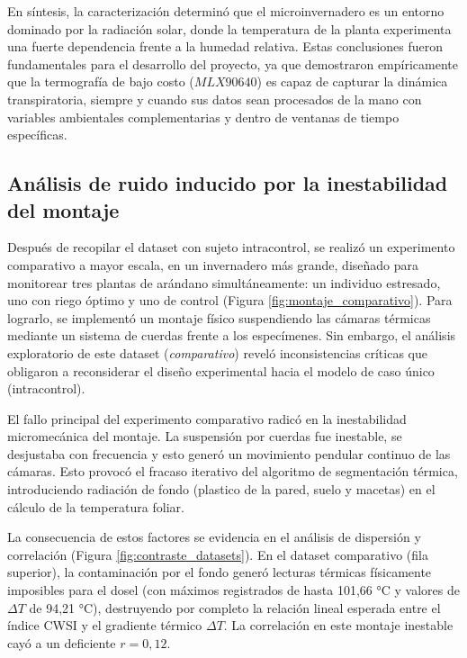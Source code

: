 En síntesis, la caracterización determinó que el microinvernadero es un entorno dominado por la radiación solar, donde la temperatura de la planta experimenta una fuerte dependencia frente a la humedad relativa. Estas conclusiones fueron fundamentales para el desarrollo del proyecto, ya que demostraron empíricamente que la termografía de bajo costo ($MLX90640$) es capaz de capturar la dinámica transpiratoria, siempre y cuando sus datos sean procesados de la mano con variables ambientales complementarias y dentro de ventanas de tiempo específicas.

\subsection{Análisis de ruido inducido por la inestabilidad del montaje}
\label{subsec:exp_analisis_ruido}

Después de recopilar el dataset con sujeto intracontrol, se realizó un experimento comparativo a mayor escala, en un invernadero más grande, diseñado para monitorear tres plantas de arándano simultáneamente: un individuo estresado, uno con riego óptimo y uno de control (Figura \ref{fig:montaje_comparativo}). Para lograrlo, se implementó un montaje físico suspendiendo las cámaras térmicas mediante un sistema de cuerdas frente a los especímenes. Sin embargo, el análisis exploratorio de este dataset (\textit{comparativo}) reveló inconsistencias críticas que obligaron a reconsiderar el diseño experimental hacia el modelo de caso único (intracontrol).

El fallo principal del experimento comparativo radicó en la inestabilidad micromecánica del montaje. La suspensión por cuerdas fue inestable, se desjustaba con frecuencia y esto generó un movimiento pendular continuo de las cámaras. Esto provocó el fracaso iterativo del algoritmo de segmentación térmica, introduciendo radiación de fondo (plastico de la pared, suelo y macetas) en el cálculo de la temperatura foliar.

La consecuencia de estos factores se evidencia en el análisis de dispersión y correlación (Figura \ref{fig:contraste_datasets}). En el dataset comparativo (fila superior), la contaminación por el fondo generó lecturas térmicas físicamente imposibles para el dosel (con máximos registrados de hasta 101,66 °C y valores de $\Delta T$ de 94,21 °C), destruyendo por completo la relación lineal esperada entre el índice CWSI y el gradiente térmico $\Delta T$. La correlación en este montaje inestable cayó a un deficiente $r = 0,12$.

